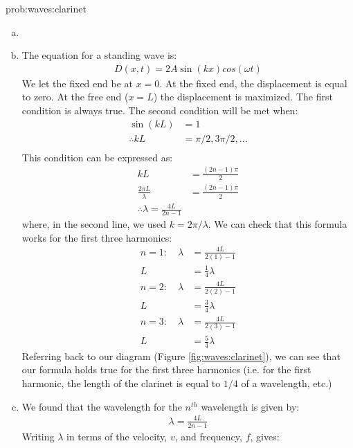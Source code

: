 \begin{solution}{prob:waves:clarinet}\label{soln:waves:clarinet}
\begin{enumerate}[(a)]
\item {}
\item The equation for a standing wave is:
\begin{align*}
D(x,t)=2A\sin(kx)cos(\omega t)
\end{align*}
We let the fixed end be at $x=0$. At the fixed end, the displacement is equal to zero. At the free end ($x=L$) the displacement is maximized. The first condition is always true. The second condition will be met when:
\begin{align*}
\sin(kL)&=1\\
\therefore kL&=\pi/2,3\pi/2,...\\
\end{align*}
This condition can be expressed as:
\begin{align*}
kL&=\frac{(2n-1)\pi}{2}\\
\frac{2\pi L}{\lambda}&=\frac{(2n-1)\pi}{2}\\
\therefore \lambda=\frac{4L}{2n-1}
\end{align*}
where, in the second line, we used $k=2\pi /\lambda$. We can check that this formula works for the first three harmonics:
\begin{align*}
n=1: \quad \lambda&=\frac{4L}{2(1)-1} \\
L&=\frac{1}{4}\lambda \\
n=2: \quad \lambda&=\frac{4L}{2(2)-1} \\
L&= \frac{3}{4}\lambda \\
n=3: \quad \lambda&=\frac{4L}{2(3)-1} \\
L&= \frac{5}{4}\lambda 
\end{align*}
Referring back to our diagram (Figure \ref{fig:waves:clarinet}), we can see that our formula holds true for the first three harmonics (i.e. for the first harmonic, the length of the clarinet is equal to $1/4$ of a wavelength, etc.)
\item We found that the wavelength for the $n^{th}$ wavelength is given by: 
\begin{align*}
\lambda=\frac{4L}{2n-1}
\end{align*}
Writing $\lambda$ in terms of the velocity, $v$, and frequency, $f$, gives:
\begin{align*}

\end{align*}
\end{enumerate}
\end{solution}
